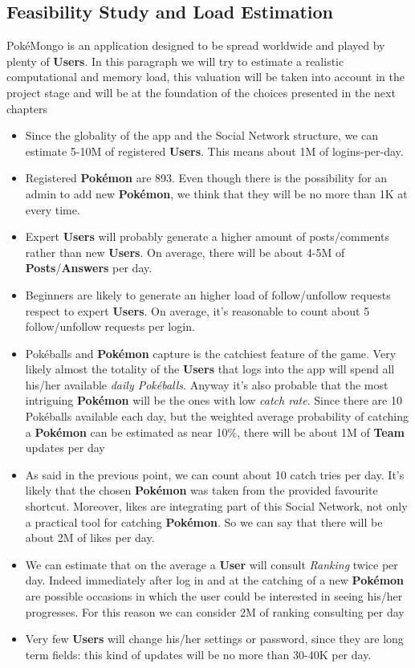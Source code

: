 \subsection{Feasibility Study and Load Estimation}
PokéMongo is an application designed to be spread worldwide and played by plenty of \textbf{Users}. In this paragraph we will try to estimate a realistic computational and memory load, this valuation will be taken into account in the project stage and will be at the foundation of the choices presented in the next chapters

\begin{itemize}
	\item Since the globality of the app and the Social Network structure, we can estimate 5-10M of registered \textbf{Users}. This means about 1M of logins-per-day.
	\item Registered \textbf{Pokémon} are 893. Even though there is the possibility for an admin to add new \textbf{Pokémon}, we think that they will be no more than 1K at every time.
	\item Expert \textbf{Users} will probably generate a higher amount of posts/comments rather than new \textbf{Users}. On average, there will be about 4-5M of \textbf{Posts}/\textbf{Answers} per day.
	\item Beginners are likely to generate an higher load of follow/unfollow requests respect to expert \textbf{Users}. On average, it’s reasonable to count about 5 follow/unfollow requests per login.
	\item Pokéballs and \textbf{Pokémon} capture is the catchiest feature of the game. Very likely almost the totality of the \textbf{Users} that logs into the app will spend all his/her available \textit{daily Pokéballs}. Anyway it’s also probable that the most intriguing \textbf{Pokémon} will be the ones with low \textit{catch rate}. Since there are 10 Pokéballs available each day, but the weighted average probability of catching a \textbf{Pokémon} can be estimated as near 10\%, there will be about 1M of \textbf{Team} updates per day
	\item As said in the previous point, we can count about 10 catch tries per day. It’s likely that the chosen \textbf{Pokémon} was taken from the provided favourite shortcut. Moreover, likes are integrating part of this Social Network, not only a practical tool for catching \textbf{Pokémon}. So we can say that there will be about 2M of likes per day.
	\item We can estimate that on the average a \textbf{User} will consult \textit{Ranking} twice per day. Indeed immediately after log in and at the catching of a new \textbf{Pokémon} are possible occasions in which the user could be interested in seeing his/her progresses. For this reason we can consider 2M of ranking consulting per day
	\item Very few \textbf{Users} will change his/her settings or password, since they are long term fields: this kind of updates will be no more than 30-40K per day.
\end{itemize}

